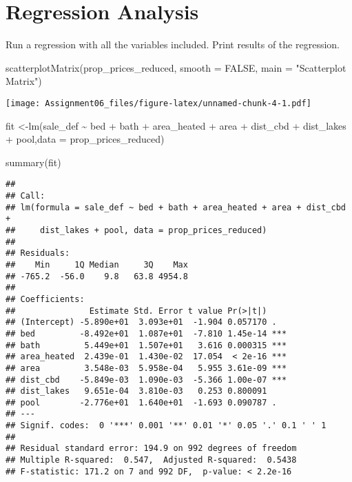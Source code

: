 \documentclass[
]{article}
\newenvironment{Shaded}{\begin{snugshade}}{\end{snugshade}}
\newcommand{\AttributeTok}[1]{\textcolor[rgb]{0.77,0.63,0.00}{#1}}
\newcommand{\ConstantTok}[1]{\textcolor[rgb]{0.00,0.00,0.00}{#1}}
\newcommand{\FunctionTok}[1]{\textcolor[rgb]{0.00,0.00,0.00}{#1}}
\newcommand{\NormalTok}[1]{#1}
\newcommand{\OtherTok}[1]{\textcolor[rgb]{0.56,0.35,0.01}{#1}}
\newcommand{\SpecialCharTok}[1]{\textcolor[rgb]{0.00,0.00,0.00}{#1}}
\newcommand{\StringTok}[1]{\textcolor[rgb]{0.31,0.60,0.02}{#1}}
\begin{document}
\hypertarget{regression-analysis}{%
\section{Regression Analysis}\label{regression-analysis}}

Run a regression with all the variables included. Print results of the
regression.

\begin{Shaded}
\begin{Highlighting}[]
\FunctionTok{scatterplotMatrix}\NormalTok{(prop\_prices\_reduced, }\AttributeTok{smooth =} \ConstantTok{FALSE}\NormalTok{, }\AttributeTok{main =} \StringTok{"Scatterplot Matrix"}\NormalTok{)}
\end{Highlighting}
\end{Shaded}

\texttt{[image: Assignment06\_files/figure-latex/unnamed-chunk-4-1.pdf]}

\begin{Shaded}
\begin{Highlighting}[]
\NormalTok{fit }\OtherTok{\textless{}{-}}\FunctionTok{lm}\NormalTok{(sale\_def }\SpecialCharTok{\textasciitilde{}}\NormalTok{ bed }\SpecialCharTok{+}\NormalTok{ bath }\SpecialCharTok{+}\NormalTok{ area\_heated }\SpecialCharTok{+}\NormalTok{ area }\SpecialCharTok{+}\NormalTok{ dist\_cbd }\SpecialCharTok{+}\NormalTok{ dist\_lakes }\SpecialCharTok{+}\NormalTok{ pool,}\AttributeTok{data =}\NormalTok{ prop\_prices\_reduced)}

\FunctionTok{summary}\NormalTok{(fit)}
\end{Highlighting}
\end{Shaded}

\begin{verbatim}
## 
## Call:
## lm(formula = sale_def ~ bed + bath + area_heated + area + dist_cbd + 
##     dist_lakes + pool, data = prop_prices_reduced)
## 
## Residuals:
##    Min     1Q Median     3Q    Max 
## -765.2  -56.0    9.8   63.8 4954.8 
## 
## Coefficients:
##               Estimate Std. Error t value Pr(>|t|)    
## (Intercept) -5.890e+01  3.093e+01  -1.904 0.057170 .  
## bed         -8.492e+01  1.087e+01  -7.810 1.45e-14 ***
## bath         5.449e+01  1.507e+01   3.616 0.000315 ***
## area_heated  2.439e-01  1.430e-02  17.054  < 2e-16 ***
## area         3.548e-03  5.958e-04   5.955 3.61e-09 ***
## dist_cbd    -5.849e-03  1.090e-03  -5.366 1.00e-07 ***
## dist_lakes   9.651e-04  3.810e-03   0.253 0.800091    
## pool        -2.776e+01  1.640e+01  -1.693 0.090787 .  
## ---
## Signif. codes:  0 '***' 0.001 '**' 0.01 '*' 0.05 '.' 0.1 ' ' 1
## 
## Residual standard error: 194.9 on 992 degrees of freedom
## Multiple R-squared:  0.547,  Adjusted R-squared:  0.5438 
## F-statistic: 171.2 on 7 and 992 DF,  p-value: < 2.2e-16
\end{verbatim}
\end{document}
